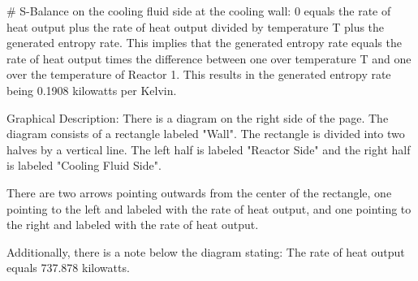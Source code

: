 # S-Balance on the cooling fluid side at the cooling wall:
0 equals the rate of heat output plus the rate of heat output divided by temperature T plus the generated entropy rate.
This implies that the generated entropy rate equals the rate of heat output times the difference between one over temperature T and one over the temperature of Reactor 1.
This results in the generated entropy rate being 0.1908 kilowatts per Kelvin.

Graphical Description:
There is a diagram on the right side of the page. The diagram consists of a rectangle labeled "Wall". The rectangle is divided into two halves by a vertical line. The left half is labeled "Reactor Side" and the right half is labeled "Cooling Fluid Side".

There are two arrows pointing outwards from the center of the rectangle, one pointing to the left and labeled with the rate of heat output, and one pointing to the right and labeled with the rate of heat output.

Additionally, there is a note below the diagram stating:
The rate of heat output equals 737.878 kilowatts.